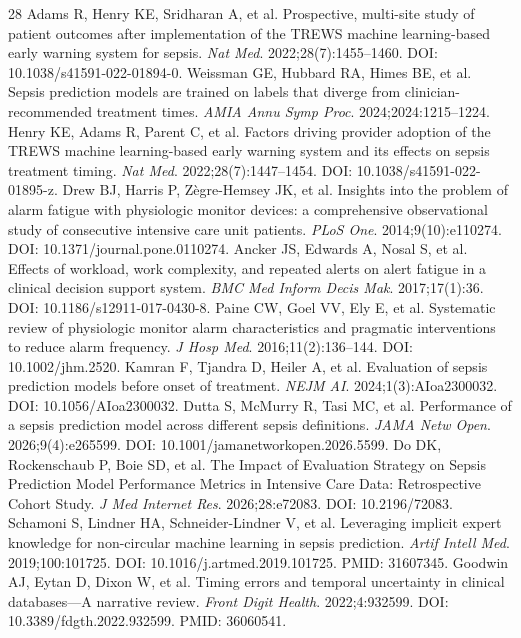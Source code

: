 \documentclass[10pt,twocolumn,a4paper]{article}
\begin{document}
\begin{thebibliography}{28}
 Adams R, Henry KE, Sridharan A, et al. Prospective, multi-site study of patient outcomes after implementation of the TREWS machine learning-based early warning system for sepsis. \textit{Nat Med}. 2022;28(7):1455--1460. DOI: 10.1038/s41591-022-01894-0.
 Weissman GE, Hubbard RA, Himes BE, et al. Sepsis prediction models are trained on labels that diverge from clinician-recommended treatment times. \textit{AMIA Annu Symp Proc}. 2024;2024:1215--1224.
 Henry KE, Adams R, Parent C, et al. Factors driving provider adoption of the TREWS machine learning-based early warning system and its effects on sepsis treatment timing. \textit{Nat Med}. 2022;28(7):1447--1454. DOI: 10.1038/s41591-022-01895-z.
 Drew BJ, Harris P, Zègre-Hemsey JK, et al. Insights into the problem of alarm fatigue with physiologic monitor devices: a comprehensive observational study of consecutive intensive care unit patients. \textit{PLoS One}. 2014;9(10):e110274. DOI: 10.1371/journal.pone.0110274.
 Ancker JS, Edwards A, Nosal S, et al. Effects of workload, work complexity, and repeated alerts on alert fatigue in a clinical decision support system. \textit{BMC Med Inform Decis Mak}. 2017;17(1):36. DOI: 10.1186/s12911-017-0430-8.
 Paine CW, Goel VV, Ely E, et al. Systematic review of physiologic monitor alarm characteristics and pragmatic interventions to reduce alarm frequency. \textit{J Hosp Med}. 2016;11(2):136--144. DOI: 10.1002/jhm.2520.
 Kamran F, Tjandra D, Heiler A, et al. Evaluation of sepsis prediction models before onset of treatment. \textit{NEJM AI}. 2024;1(3):AIoa2300032. DOI: 10.1056/AIoa2300032.
 Dutta S, McMurry R, Tasi MC, et al. Performance of a sepsis prediction model across different sepsis definitions. \textit{JAMA Netw Open}. 2026;9(4):e265599. DOI: 10.1001/jamanetworkopen.2026.5599.
 Do DK, Rockenschaub P, Boie SD, et al. The Impact of Evaluation Strategy on Sepsis Prediction Model Performance Metrics in Intensive Care Data: Retrospective Cohort Study. \textit{J Med Internet Res}. 2026;28:e72083. DOI: 10.2196/72083.
 Schamoni S, Lindner HA, Schneider-Lindner V, et al. Leveraging implicit expert knowledge for non-circular machine learning in sepsis prediction. \textit{Artif Intell Med}. 2019;100:101725. DOI: 10.1016/j.artmed.2019.101725. PMID: 31607345.
 Goodwin AJ, Eytan D, Dixon W, et al. Timing errors and temporal uncertainty in clinical databases---A narrative review. \textit{Front Digit Health}. 2022;4:932599. DOI: 10.3389/fdgth.2022.932599. PMID: 36060541.

\end{thebibliography}
\end{document}
